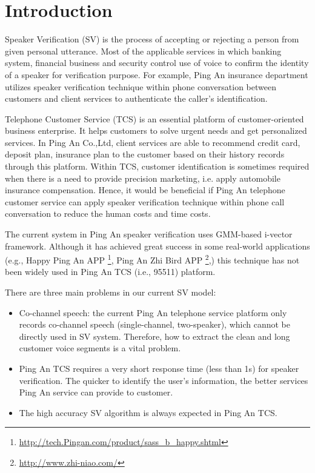 \section{Introduction}

Speaker Verification (SV) is the process of accepting or rejecting a person from given personal utterance. Most of the applicable services in which banking system, financial business and security control use of voice to confirm the identity of a speaker for verification purpose. For example, Ping An insurance department utilizes speaker verification technique within phone conversation between customers and client services to authenticate the caller's identification.

Telephone Customer Service (TCS) is an essential platform of customer-oriented business enterprise. It helps customers to solve urgent needs and get personalized services. In Ping An Co.,Ltd, client services are able to recommend credit card, deposit plan, insurance plan to the customer based on their history records through this platform. Within TCS, customer identification is sometimes required when there is a need to provide precision marketing, i.e. apply automobile insurance compensation. Hence, it would be beneficial if Ping An telephone customer service can apply speaker verification technique within phone call conversation to reduce the human costs and time costs.

The current system in Ping An speaker verification uses GMM-based i-vector framework. Although it has achieved great success in some real-world applications (e.g., Happy Ping An APP \footnote{\url{http://tech.Pingan.com/product/sass_b_happy.shtml}}, Ping An Zhi Bird APP \footnote{\url{http://www.zhi-niao.com/}},) this technique has not been widely used in Ping An TCS (i.e., 95511) platform.

There are three main problems in our current SV model:

\begin{itemize}
\item Co-channel speech: the current Ping An telephone service platform only records co-channel speech (single-channel, two-speaker), which cannot be directly used in SV system. Therefore, how to extract the clean and long customer voice segments is a vital problem.

\item Ping An TCS requires a very short response time (less than 1s) for speaker verification. The quicker to identify the user's information, the better services Ping An service can provide to customer.

\item The high accuracy SV algorithm is always expected in Ping An TCS.

\end{itemize}

